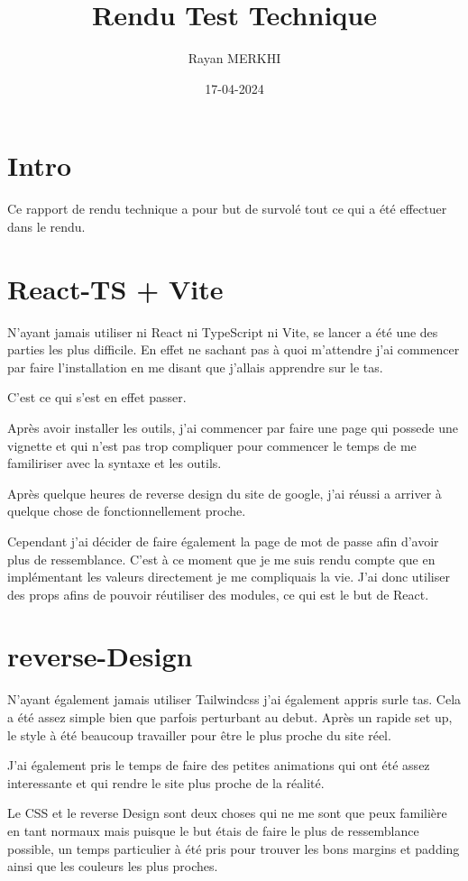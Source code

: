 \documentclass{report}
\author{Rayan MERKHI}
\title{Rendu Test Technique}
\date{17-04-2024}
\begin{document}
\chapter{Intro}

Ce rapport de rendu technique a pour but de survolé tout ce qui a été effectuer
 dans le rendu.

\chapter{React-TS + Vite}

N'ayant jamais utiliser ni React ni TypeScript ni Vite, se lancer a été une des
parties les plus difficile. En effet ne sachant pas à quoi m'attendre j'ai
commencer par faire l'installation en me disant que j'allais apprendre sur le 
tas.

C'est ce qui s'est en effet passer.

Après avoir installer les outils, j'ai commencer par faire une page qui possede
une vignette et qui n'est pas trop compliquer pour commencer le temps de me 
familiriser avec la syntaxe et les outils.

Après quelque heures de reverse design du site de google, j'ai réussi a arriver
à quelque chose de fonctionnellement proche.

Cependant j'ai décider de faire également la page de mot de passe afin d'avoir
plus de ressemblance. C'est à ce moment que je me suis rendu compte que en 
implémentant les valeurs directement je me compliquais la vie. J'ai donc
utiliser des props afins de pouvoir réutiliser des modules, ce qui est le but
de React.

\chapter{reverse-Design}

N'ayant également jamais utiliser Tailwindcss j'ai également appris surle tas.
Cela a été assez simple bien que parfois perturbant au debut. Après un rapide 
set up, le style à été beaucoup travailler pour être le plus proche du site
réel.

J'ai également pris le temps de faire des petites animations qui ont été assez
interessante et qui rendre le site plus proche de la réalité. 

Le CSS et le reverse Design sont deux choses qui ne me sont que peux familière
en tant normaux mais puisque le but étais de faire le plus de ressemblance
possible, un temps particulier à été pris pour trouver les bons margins et
padding ainsi que les couleurs les plus proches.
\end{document}
